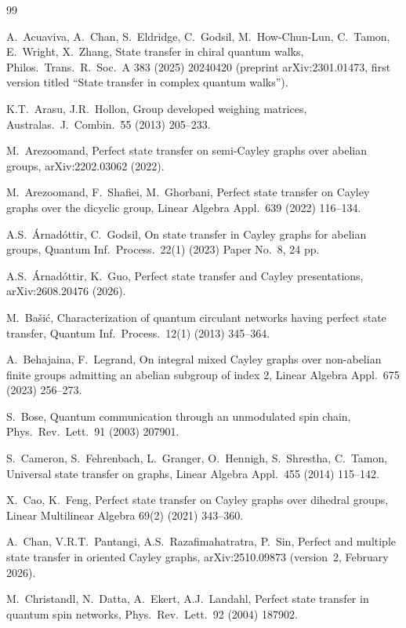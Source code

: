 \documentclass[preprint,11pt]{elsarticle}
\theoremstyle{definition}
\theoremstyle{remark}
\begin{document}
\begin{thebibliography}{99}

 A.\ Acuaviva, A.\ Chan, S.\ Eldridge, C.\ Godsil, M.\ How-Chun-Lun, C.\ Tamon, E.\ Wright, X.\ Zhang, State transfer in chiral quantum walks, Philos.\ Trans.\ R.\ Soc.\ A 383 (2025) 20240420 (preprint arXiv:2301.01473, first version titled ``State transfer in complex quantum walks'').

 K.T.\ Arasu, J.R.\ Hollon, Group developed weighing matrices, Australas.\ J.\ Combin.\ 55 (2013) 205--233.

 M.\ Arezoomand, Perfect state transfer on semi-Cayley graphs over abelian groups, arXiv:2202.03062 (2022).

 M.\ Arezoomand, F.\ Shafiei, M.\ Ghorbani, Perfect state transfer on Cayley graphs over the dicyclic group, Linear Algebra Appl.\ 639 (2022) 116--134.

 A.S.\ \'Arnad\'ottir, C.\ Godsil, On state transfer in Cayley graphs for abelian groups, Quantum Inf.\ Process.\ 22(1) (2023) Paper No.~8, 24 pp.

 A.S.\ \'Arnad\'ottir, K.\ Guo, Perfect state transfer and Cayley presentations, arXiv:2608.20476 (2026).

 M.\ Ba\v{s}i\'c, Characterization of quantum circulant networks having perfect state transfer, Quantum Inf.\ Process.\ 12(1) (2013) 345--364.

 A.\ Behajaina, F.\ Legrand, On integral mixed Cayley graphs over non-abelian finite groups admitting an abelian subgroup of index 2, Linear Algebra Appl.\ 675 (2023) 256--273.

 S.\ Bose, Quantum communication through an unmodulated spin chain, Phys.\ Rev.\ Lett.\ 91 (2003) 207901.

 S.\ Cameron, S.\ Fehrenbach, L.\ Granger, O.\ Hennigh, S.\ Shrestha, C.\ Tamon, Universal state transfer on graphs, Linear Algebra Appl.\ 455 (2014) 115--142.

 X.\ Cao, K.\ Feng, Perfect state transfer on Cayley graphs over dihedral groups, Linear Multilinear Algebra 69(2) (2021) 343--360.

 A.\ Chan, V.R.T.\ Pantangi, A.S.\ Razafimahatratra, P.\ Sin, Perfect and multiple state transfer in oriented Cayley graphs, arXiv:2510.09873 (version~2, February 2026).

 M.\ Christandl, N.\ Datta, A.\ Ekert, A.J.\ Landahl, Perfect state transfer in quantum spin networks, Phys.\ Rev.\ Lett.\ 92 (2004) 187902.


\end{thebibliography}
\end{document}
